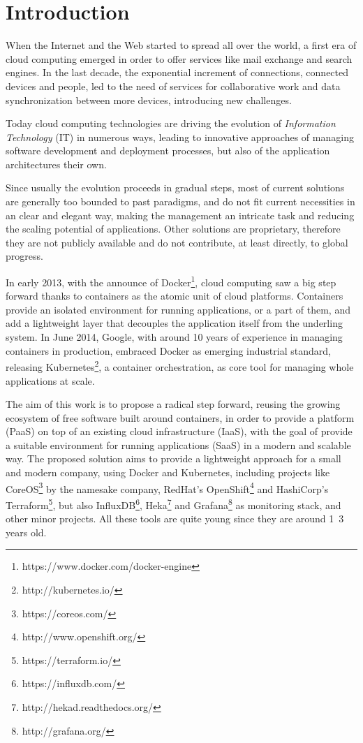 \chapter{Introduction}\label{introduction}

When the Internet and the Web started to spread all over the world, a first era of cloud computing\cite{A Break in the Clouds: Towards a Cloud Definition} emerged in order to offer services like mail exchange and search engines.  In the last decade,  the exponential increment of connections, connected devices and people, led to the need of services for collaborative work and data synchronization between more devices, introducing new challenges.

Today cloud computing technologies are driving the evolution of \textit{Information Technology} (IT) in numerous ways, leading to innovative approaches of managing software development and deployment processes, but also of the application architectures their own.

Since usually the evolution proceeds in gradual steps, most of current solutions are generally too bounded to past paradigms, and do not fit current necessities in an clear and elegant way, making the management an 
intricate task and reducing the scaling potential of applications.  Other solutions are proprietary, therefore they are not publicly available and do not contribute, at least directly, to global progress.

In early 2013, with the announce of Docker\footnote{https://www.docker.com/docker-engine}, cloud computing saw a big step forward thanks to containers as the atomic unit of cloud platforms.  Containers provide an isolated environment for running applications, or a part of them, and add a lightweight layer that decouples the application itself from the underling system.  In June 2014, Google, with around 10 years of experience in managing containers in production, embraced Docker as emerging industrial standard, releasing Kubernetes\footnote{http://kubernetes.io/}, a container orchestration, as core tool for managing whole applications at scale.

The aim of this work is to propose a radical step forward, reusing the growing ecosystem of free software built around containers, in order to provide a platform\cite{Developing Software Online With Platform-as-a-Service Technology} (PaaS) on top of an existing cloud infrastructure\cite{A survey and taxonomy of infrastructure as a service and web hosting cloud providers} (IaaS), with the goal of provide a suitable environment for running applications\cite{Understanding service-oriented software} (SaaS) in a modern and scalable way.  The proposed solution aims to provide a lightweight approach for a small and modern company, using Docker and Kubernetes, including projects like CoreOS\footnote{https://coreos.com/} by the namesake company, RedHat's OpenShift\footnote{http://www.openshift.org/} and HashiCorp's Terraform\footnote{https://terraform.io/}, but also InfluxDB\footnote{https://influxdb.com/}, Heka\footnote{http://hekad.readthedocs.org/} and Grafana\footnote{http://grafana.org/} as monitoring stack, and other minor projects.  All these tools are quite young since they are around 1~3 years old.

